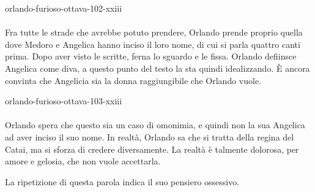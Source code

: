 \documentclass[preview]{standalone}
\begin{document}
\begin{snippet}{orlando-furioso-ottava-102-xxiii}
    \\\\
    Fra tutte le strade che avrebbe potuto prendere, Orlando prende proprio
    quella dove Medoro e Angelica hanno inciso il loro nome, di cui si parla quattro canti prima.
    Dopo aver visto le scritte, ferna lo sguardo e le fissa.
    Orlando defiinsce Angelica come diva, a questo punto del testo la sta quindi idealizzando.
    È ancora convinta che Angelicia sia la donna raggiungibile che Orlando vuole.
\end{snippet}

\begin{snippet}{orlando-furioso-ottava-103-xxiii}
    \\\\
    Orlando spera che questo sia un caso di omonimia, e quindi non la sua Angelica ad aver inciso il
    suo nome.
    In realtà, Orlando sa che si tratta della regina del Catai, ma si sforza di credere
    diversamente. La realtà è talmente dolorosa, per amore e gelosia, che non vuole accettarla.

    La ripetizione di questa parola indica il suo pensiero ossessivo.
\end{snippet}
\end{document}
